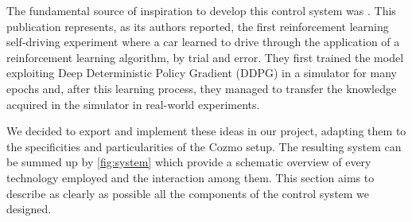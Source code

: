 The fundamental source of inspiration to develop this control system was \cite{kendall2018learning,kendall2019learning}. This publication represents, as its authors reported,  the first reinforcement learning self-driving experiment where a car learned to drive through the application of a reinforcement learning algorithm, by trial and error. They first trained the model exploiting Deep Deterministic Policy Gradient (DDPG) in a simulator for many epochs and, after this learning process, they managed to transfer the knowledge acquired in the simulator in real-world experiments. 

We decided to export and implement these ideas in our project, adapting them to the specificities and particularities of the Cozmo setup. The resulting system can be summed up by \vref{fig:system} which provide a schematic overview of every technology employed and the interaction among them.
This section aims to describe as clearly as possible all the components of the control system we designed.


